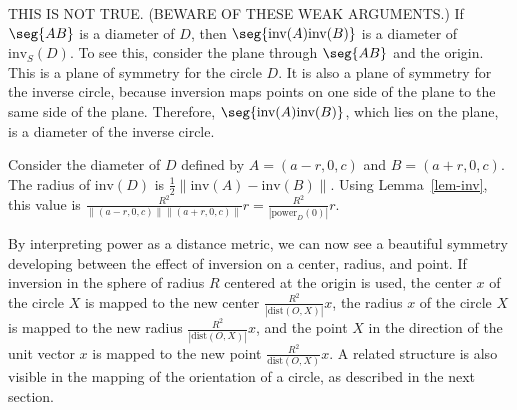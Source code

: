 THIS IS NOT TRUE.
(BEWARE OF THESE WEAK ARGUMENTS.)
If $\seg{AB}$ is a diameter of $D$, 
then $\seg{\mbox{inv}(A)\mbox{inv}(B)}$ 
is a diameter of $\mbox{inv}_{S}(D)$.
To see this, consider the plane through $\seg{AB}$ and the origin.
This is a plane of symmetry for the circle $D$.
It is also a plane of symmetry for the inverse circle, because
inversion maps points on one side of the plane to the same side of the plane.
Therefore, $\seg{\mbox{inv}(A)\mbox{inv}(B)}$, which lies on the plane, 
is a diameter of the inverse circle.

Consider the diameter of $D$ defined by $A=(a-r,0,c)$ and $B=(a+r,0,c)$.
The radius of $\mbox{inv}(D)$ is 
$\frac{1}{2} \|\mbox{inv}(A) - \mbox{inv}(B)\|$. 
Using Lemma~\ref{lem-inv}, this value is 
$\frac{R^{2}}{\|(a-r,0,c)\|\|(a+r,0,c)\|} r
= \frac{R^{2}}{|\mbox{power}_{D}(0)|} r$.
%
%
\QED

By interpreting power as a distance metric, we can now see a beautiful
symmetry developing between the effect of inversion on a center, radius, 
and point.
If inversion in the sphere of radius $R$ centered at the origin is used,
the center $x$ of the circle $X$ is mapped to the new center 
$\frac{R^{2}}{|\mbox{dist}(O,X)|} x$,
the radius $x$ of the circle $X$ is mapped to the new radius
$\frac{R^{2}}{|\mbox{dist}(O,X)|} x$,
and the point $X$ in the direction of the unit vector $x$ is mapped to
the new point $\frac{R^{2}}{\mbox{dist}(O,X)} x$.
A related structure is also visible in the mapping of the orientation of
a circle, as described in the next section.

